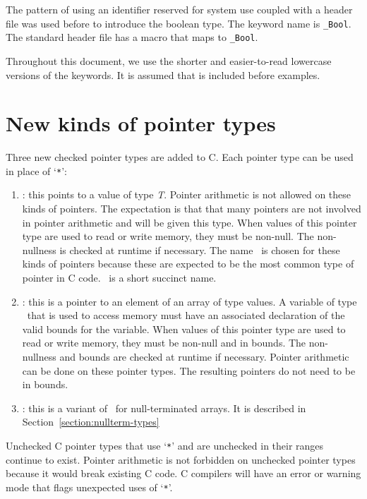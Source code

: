The pattern of using an identifier reserved for system use coupled with
a header file was used before to introduce the boolean type. The keyword
name is \verb+_Bool+.  The standard header file 
has a macro that maps  to \verb+_Bool+.

Throughout this document, we use the shorter and easier-to-read
lowercase versions of the keywords.  It is assumed
that  is included before examples.

\section{New kinds of pointer types}
Three new checked pointer types are added to C. Each pointer type can be
used in place of `\texttt{*}':
\begin{enumerate}
\item
  \ptrT: this points to
  a value of type \textit{T}. Pointer arithmetic is not allowed on these
  kinds of pointers. The expectation is that that many pointers are not
  involved in pointer arithmetic and will be given this type. When
  values of this pointer type are used to read or write memory, they
  must be non-null. The non-nullness is checked at runtime if necessary.
  The name \ptr\ is chosen for these kinds of pointers because these
  are expected to be the most common type of pointer in C code. \ptr\
  is a short succinct name.
\item
  \arrayptrT: this is
  a pointer to an element of an array of type  values. A
  variable of type \arrayptr\ that is used to access memory
  must have an associated declaration of the valid bounds for the
  variable. When values of this pointer type are used to read or write
  memory, they must be non-null and in bounds. The non-nullness and
  bounds are checked at runtime if necessary. Pointer arithmetic can be
  done on these pointer types. The resulting pointers do not need to be
  in bounds.
\item
 \ntarrayptrT: this is a variant of \arrayptrT\ for null-terminated
 arrays.  It is described in Section~\ref{section:nullterm-types}
\end{enumerate}

Unchecked C pointer types that use `\texttt{*}' and are unchecked in their
ranges continue to exist. Pointer arithmetic is not forbidden on unchecked
pointer types because it would break existing C code. C compilers will
have an error or warning mode that flags unexpected uses of `\texttt{*}'.

